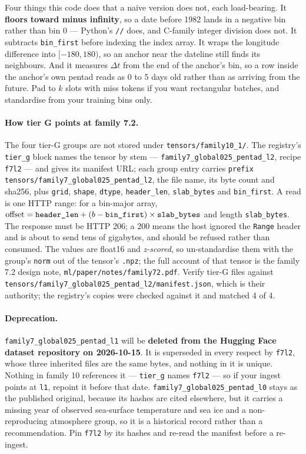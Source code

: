 \documentclass[10pt]{article}
\newcommand{\code}[1]{\texttt{#1}}
\begin{document}
Four things this code does that a naive version does not, each load-bearing.
It \textbf{floors toward minus infinity}, so a date before 1982 lands in a
negative bin rather than bin 0 --- Python's \code{//} does, and C-family integer
division does not. It subtracts \code{bin\_first} before indexing the index
array. It
wraps the longitude difference into $[-180, 180)$, so an anchor near the
dateline still finds its neighbours. And it measures $\Delta t$ from the end of
the anchor's bin, so a row inside the anchor's own pentad reads as 0 to 5 days
old rather than as arriving from the future. Pad to $k$ slots with miss tokens
if you want rectangular batches, and standardise from your training bins only.

\paragraph{How tier G points at family 7.2.} The four tier-G groups are not
stored under \code{tensors/family10\_1/}. The registry's \code{tier\_g} block names
the tensor by stem --- \code{family7\_global025\_pentad\_l2}, recipe \code{f7l2}
--- and gives its manifest URL; each group entry carries \code{prefix}
\code{tensors/family7\_global025\_pentad\_l2}, the file name, its byte count and
sha256, plus \code{grid}, \code{shape}, \code{dtype}, \code{header\_len},
\code{slab\_bytes} and \code{bin\_first}. A read is one HTTP range: for a
bin-major array, $\mathrm{offset} = \text{\code{header\_len}} +
(b - \text{\code{bin\_first}}) \times \text{\code{slab\_bytes}}$ and length
\code{slab\_bytes}. The response must be HTTP 206; a 200 means the host ignored
the \code{Range} header and is about to send tens of gigabytes, and should be
refused rather than consumed. The values are float16 and \emph{z-scored}, so
un-standardise them with the group's \code{norm} out of the tensor's
\code{.npz}; the full account of that tensor is the family 7.2 design note,
\code{ml/paper/notes/family72.pdf}. Verify tier-G files against
\code{tensors/family7\_global025\_pentad\_l2/manifest.json}, which is their
authority; the registry's copies were checked against it and matched 4 of 4.

\paragraph{Deprecation.} \code{family7\_global025\_pentad\_l1} will be
\textbf{deleted from the Hugging Face dataset repository on 2026-10-15}. It is
superseded in every respect by \code{f7l2}, whose three inherited files are the
same bytes, and nothing in it is unique. Nothing in family 10 references it ---
\code{tier\_g} names \code{f7l2} --- so if your ingest points at \code{l1},
repoint it before that date. \code{family7\_global025\_pentad\_l0} stays as the
published original, because its hashes are cited elsewhere, but it carries a
missing year of observed sea-surface temperature and sea ice and a
non-reproducing atmosphere group, so it is a historical record rather than a
recommendation. Pin \code{f7l2} by its hashes and re-read the manifest before a
re-ingest.
\end{document}

